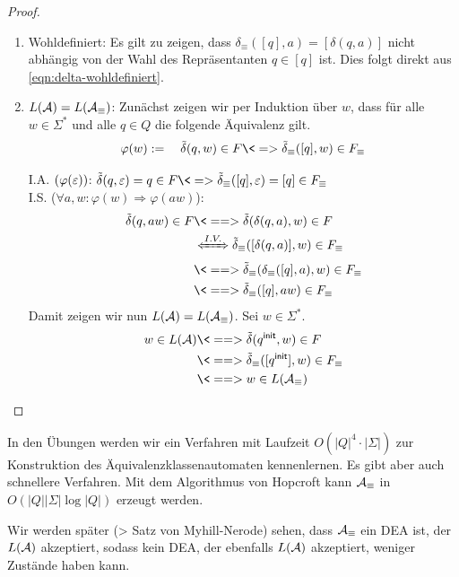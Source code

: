 \begin{proof}\ 
        \begin{enumerate}
                \item Wohldefiniert: Es gilt zu zeigen, dass $\delta_\equiv([q],a) =[\delta(q,a)]$ nicht abhängig von der Wahl des Repräsentanten $q\in [q]$ ist. Dies folgt direkt aus \autoref{eqn:delta-wohldefiniert}.
                \item $L(\mathcal{A})=L(\mathcal{A}_\equiv)$:
                Zunächst zeigen wir per Induktion über $w$, dass für alle $w\in\Sigma^*$ und alle $q\in Q$ die folgende Äquivalenz gilt.
                \[\varphi(w) := \quad \tilde\delta(q,w)\in F \<=> \tilde\delta_\equiv([q],w)\in F_\equiv\]
                
                
                I.A. $(\varphi(\varepsilon))$: $\tilde\delta(q,\Eps)=q\in F \<=> \tilde\delta_\equiv([q],\Eps)=[q]\in F_\equiv$\\
                I.S. ($\forall a,w: \varphi(w)\Rightarrow \varphi( aw)$): \begin{align*}
                \tilde\delta(q,aw)\in F &\<==> \tilde\delta(\delta(q,a),w)\in F\\ &\xLeftrightarrow{I.V.} \tilde\delta_\equiv([\delta(q,a)],w)\in F_\equiv\\
                &\<==> \tilde\delta_\equiv(\delta_\equiv([q],a),w)\in F_\equiv\\
                &\<==> \tilde\delta_\equiv([q],a w)\in F_\equiv
                \end{align*}
                Damit zeigen wir nun $L(\mathcal{A})=L(\mathcal{A}_\equiv)$. Sei $w\in\Sigma^*$.
                \begin{align*}
                 w\in L(\A)
                 & \<==> \tilde\delta(\qinit,w) \in F\\
                 & \<==> \tilde\delta_\equiv([\qinit],w) \in F_\equiv\\
                 & \<==> w\in L(\A_\equiv)
                 \qedhere
                \end{align*}
        \end{enumerate}
\end{proof}
In den Übungen werden wir ein Verfahren mit Laufzeit $O(|Q|^4\cdot |\Sigma|)$ zur Konstruktion des Äquivalenzklassenautomaten kennenlernen. Es gibt aber auch schnellere Verfahren. Mit dem Algorithmus von Hopcroft kann $\mathcal{A}_\equiv$ in $O(|Q||\Sigma|\log|Q|)$ erzeugt werden.

Wir werden später (\-> Satz von Myhill-Nerode) sehen, dass $\mathcal{A}_\equiv$
ein \acs*{DEA} ist, der $L(\mathcal{A})$ akzeptiert, sodass kein \acs*{DEA},
der ebenfalls $L(\mathcal{A})$ akzeptiert, weniger Zustände haben kann.

